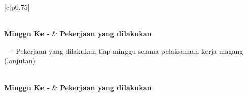 \begin{center}
\begin{longtable}{|c|p{}|}
\caption{Pekerjaan yang dilakukan tiap minggu selama pelaksanaan kerja magang}
\label{tab:tbl_uraian} \\
\hline
\textbf{Minggu Ke -} & \textbf{Pekerjaan yang dilakukan} \\
\hline
\endfirsthead

%
{{\parbox{\textwidth}{\centering \tablename\ \thetable{} -- Pekerjaan yang dilakukan tiap minggu selama pelaksanaan kerja magang (lanjutan)}}} \\
\hline
\textbf{Minggu Ke -} & \textbf{Pekerjaan yang dilakukan} \\
\hline
\endhead

\hline {} \\
\hline
\endfoot

\hline \hline
\endlastfoot


\end{longtable}
\end{center}
